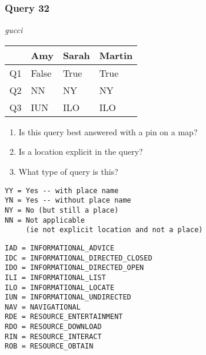 \begin{frame}[fragile]
\frametitle{Query 32}
\vspace{1em}

\emph{gucci}

\vfill

\begin{table}
  \centering
  \begin{tabular}{ l l l l }
    & \textbf{Amy} & \textbf{Sarah} & \textbf{Martin}\\
    \toprule
    Q1 & False & True & True\\
Q2 & NN & NY & NY\\
Q3 & IUN & ILO & ILO\\
    \bottomrule
  \end{tabular}
\end{table}

\vfill

\tiny{

\begin{enumerate}
\item Is this query best answered with a pin on a map?
\item Is a location explicit in the query?
\item What type of query is this?
\end{enumerate}

\vfill

\begin{multicols}{2}
\begin{verbatim}
YY = Yes -- with place name
YN = Yes -- without place name
NY = No (but still a place)
NN = Not applicable 
     (ie not explicit location and not a place)
\end{verbatim}

\columnbreak
\begin{verbatim}
IAD = INFORMATIONAL_ADVICE
IDC = INFORMATIONAL_DIRECTED_CLOSED
IDO = INFORMATIONAL_DIRECTED_OPEN
ILI = INFORMATIONAL_LIST
ILO = INFORMATIONAL_LOCATE
IUN = INFORMATIONAL_UNDIRECTED
NAV = NAVIGATIONAL
RDE = RESOURCE_ENTERTAINMENT
RDO = RESOURCE_DOWNLOAD
RIN = RESOURCE_INTERACT
ROB = RESOURCE_OBTAIN
\end{verbatim}
\end{multicols}
}

\end{frame}


